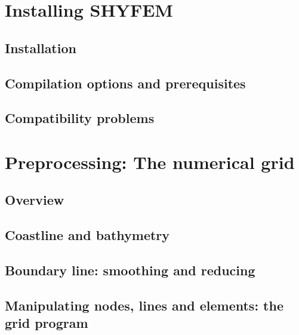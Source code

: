 \documentclass{report}
\begin{document}
\chapter{Installing SHYFEM}

	\section{Installation}
	

	\section{Compilation options and prerequisites}

	


	\section{Compatibility problems}
	


\chapter{Preprocessing: The numerical grid}

	\section{Overview}
	

	\section{Coastline and bathymetry}
	

	\section{Boundary line: smoothing and reducing}
	

	\section{Manipulating nodes, lines and elements: the grid program}
	
\end{document}
